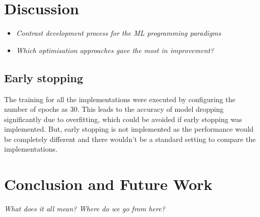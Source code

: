 \chapter{Discussion}

\begin{itemize}
	\item \textit{Contrast development process for the ML programming paradigms}
	\item \textit{Which optimisation approaches gave the most in improvement?}
\end{itemize}

\section{Early stopping}
The training for all the implementations were executed by configuring the number of epochs as 30. This leads to the accuracy of model dropping significantly due to overfitting, which could be avoided if early stopping was implemented.
But, early stopping is not implemented as the performance would be completely different and there wouldn't be a standard setting to compare the implementations.



\chapter{Conclusion and Future Work}
\textit{What does it all mean? Where do we go from here?}
